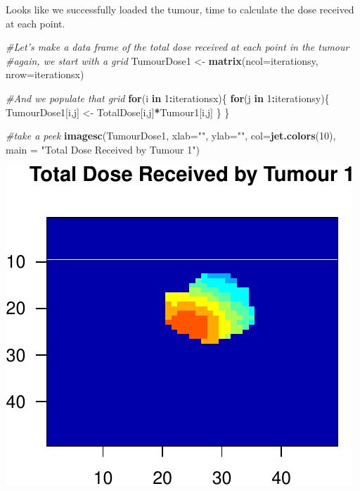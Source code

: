 \documentclass[]{article}
\newenvironment{Shaded}{\begin{snugshade}}{\end{snugshade}}
\newcommand{\KeywordTok}[1]{\textcolor[rgb]{0.13,0.29,0.53}{\textbf{#1}}}
\newcommand{\DataTypeTok}[1]{\textcolor[rgb]{0.13,0.29,0.53}{#1}}
\newcommand{\DecValTok}[1]{\textcolor[rgb]{0.00,0.00,0.81}{#1}}
\newcommand{\StringTok}[1]{\textcolor[rgb]{0.31,0.60,0.02}{#1}}
\newcommand{\CommentTok}[1]{\textcolor[rgb]{0.56,0.35,0.01}{\textit{#1}}}
\newcommand{\ControlFlowTok}[1]{\textcolor[rgb]{0.13,0.29,0.53}{\textbf{#1}}}
\newcommand{\OperatorTok}[1]{\textcolor[rgb]{0.81,0.36,0.00}{\textbf{#1}}}
\newcommand{\NormalTok}[1]{#1}
\begin{document}
Looks like we successfully loaded the tumour, time to calculate the dose
received at each point.

\begin{Shaded}
\begin{Highlighting}[]
\CommentTok{#Let's make a data frame of the total dose received at each point in the tumour}
\CommentTok{#again, we start with a grid}
\NormalTok{TumourDose1 <-}\StringTok{ }\KeywordTok{matrix}\NormalTok{(}\DataTypeTok{ncol=}\NormalTok{iterationsy, }\DataTypeTok{nrow=}\NormalTok{iterationsx)}

\CommentTok{#And we populate that grid}
\ControlFlowTok{for}\NormalTok{(i }\ControlFlowTok{in} \DecValTok{1}\OperatorTok{:}\NormalTok{iterationsx)\{}
  \ControlFlowTok{for}\NormalTok{(j }\ControlFlowTok{in} \DecValTok{1}\OperatorTok{:}\NormalTok{iterationsy)\{}
\NormalTok{    TumourDose1[i,j] <-}\StringTok{ }\NormalTok{TotalDose[i,j]}\OperatorTok{*}\NormalTok{Tumour1[i,j]}
\NormalTok{  \}}
\NormalTok{\}}

\CommentTok{#take a peek}
\KeywordTok{imagesc}\NormalTok{(TumourDose1, }\DataTypeTok{xlab=}\StringTok{""}\NormalTok{, }\DataTypeTok{ylab=}\StringTok{""}\NormalTok{, }\DataTypeTok{col=}\KeywordTok{jet.colors}\NormalTok{(}\DecValTok{10}\NormalTok{), }\DataTypeTok{main =} \StringTok{"Total Dose Received by Tumour 1"}\NormalTok{)}
\end{Highlighting}
\end{Shaded}

\begin{center}\includegraphics{TumourSurvival_files/figure-latex/unnamed-chunk-6-1} \end{center}
\end{document}
